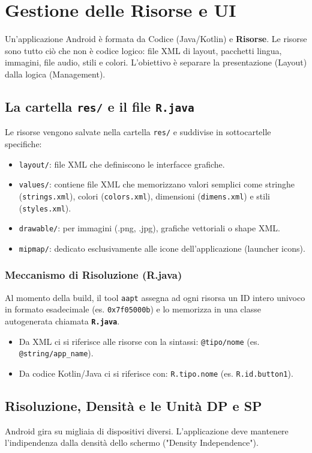 \chapter{Gestione delle Risorse e UI}

Un'applicazione Android è formata da Codice (Java/Kotlin) e \textbf{Risorse}.
Le risorse sono tutto ciò che non è codice logico: file XML di layout, pacchetti lingua, immagini, file audio, stili e colori.
L'obiettivo è separare la presentazione (Layout) dalla logica (Management).

\section{La cartella \texttt{res/} e il file \texttt{R.java}}
Le risorse vengono salvate nella cartella \texttt{res/} e suddivise in sottocartelle specifiche:
\begin{itemize}
    \item \texttt{layout/}: file XML che definiscono le interfacce grafiche.
    \item \texttt{values/}: contiene file XML che memorizzano valori semplici come stringhe (\texttt{strings.xml}), colori (\texttt{colors.xml}), dimensioni (\texttt{dimens.xml}) e stili (\texttt{styles.xml}).
    \item \texttt{drawable/}: per immagini (.png, .jpg), grafiche vettoriali o shape XML.
    \item \texttt{mipmap/}: dedicato esclusivamente alle icone dell'applicazione (launcher icons).
\end{itemize}

\subsection{Meccanismo di Risoluzione (R.java)}
Al momento della build, il tool \texttt{aapt} assegna ad ogni risorsa un ID intero univoco in formato esadecimale (es. \texttt{0x7f05000b}) e lo memorizza in una classe autogenerata chiamata \textbf{\texttt{R.java}}.
\begin{itemize}
    \item Da XML ci si riferisce alle risorse con la sintassi: \texttt{@tipo/nome} (es. \texttt{@string/app\_name}).
    \item Da codice Kotlin/Java ci si riferisce con: \texttt{R.tipo.nome} (es. \texttt{R.id.button1}).
\end{itemize}

\section{Risoluzione, Densità e le Unità DP e SP}
Android gira su migliaia di dispositivi diversi.
L'applicazione deve mantenere l'indipendenza dalla densità dello schermo ("Density Independence").


